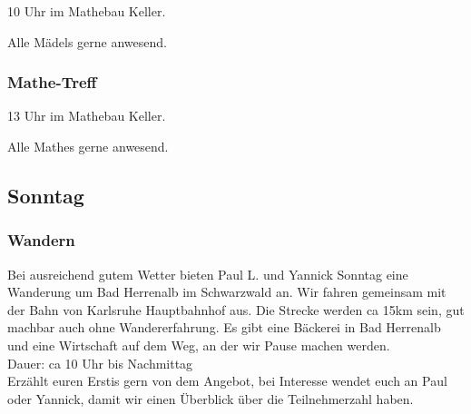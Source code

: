 \documentclass[10pt,ngerman]{scrartcl}
\begin{document}
\begin{multicols}{2}
10 Uhr im Mathebau Keller.

Alle Mädels gerne anwesend.

\subsubsection{Mathe-Treff}

13 Uhr im Mathebau Keller.

Alle Mathes gerne anwesend.

\subsection{Sonntag}

\subsubsection{Wandern}

Bei ausreichend gutem Wetter bieten Paul L. und Yannick Sonntag eine Wanderung um Bad Herrenalb im Schwarzwald an.
Wir fahren gemeinsam mit der Bahn von Karlsruhe Hauptbahnhof aus.
Die Strecke werden ca 15km sein, gut machbar auch ohne Wandererfahrung.
Es gibt eine Bäckerei in Bad Herrenalb und eine Wirtschaft auf dem Weg, an der wir Pause machen werden. \\
Dauer: ca 10 Uhr bis Nachmittag \\
Erzählt euren Erstis gern von dem Angebot, bei Interesse wendet euch an Paul oder Yannick, damit wir einen Überblick über die Teilnehmerzahl haben.

\end{multicols}
\label{LastPage}
\end{document}
